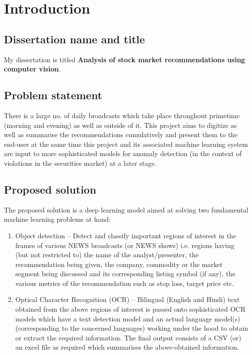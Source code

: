 \chapter{Introduction}

\thispagestyle{empty} %

\setcounter{page}{2} %

\section{Dissertation name and title}
My dissertation is titled \textbf{Analysis of stock market recommendations using computer vision}.

\section{Problem statement}

There is a large no. of daily broadcasts which take place throughout primetime (morning and evening) as well as outside of it. This project aims to digitize as well as summarise the recommendations cumulatively and present them to the end-user at the same time this project and its associated machine learning system are input to more sophisticated models for anomaly detection (in the context of violations in the securities market) at a later stage.

\section{Proposed solution}
The proposed solution is a deep learning model aimed at solving two fundamental machine learning problems at hand:
\begin{enumerate}

  \item	Object detection – Detect and classify important regions of interest in the frames of various NEWS broadcasts (or NEWS shows) i.e. regions having (but not restricted to) the name of the analyst/presenter, the recommendation being given, the company, commodity or the market segment being discussed and its corresponding listing symbol (if any), the various metrics of the recommendation such as stop loss, target price etc.

  \item  Optical Character Recognition (OCR) – Bilingual (English and Hindi) text obtained from the above regions of interest is passed onto sophisticated OCR models which have a text detection model and an actual language model(s) (corresponding to the concerned languages) working under the hood to obtain or extract the required information.
  The final output consists of a CSV (or) an excel file as required which summarises the above-obtained information.

\end{enumerate}

